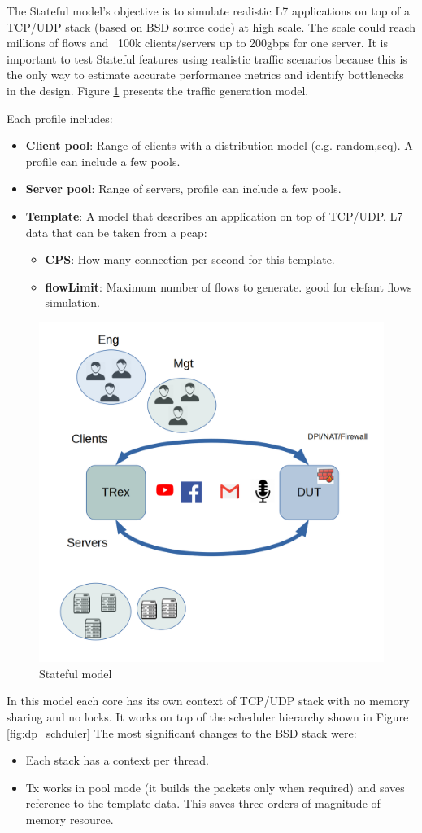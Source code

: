 \documentclass[conference]{IEEEtran}
\begin{document}
The Stateful model's objective is to simulate realistic L7 applications on top of a TCP/UDP stack (based on BSD source code) at high scale.
The scale could reach millions of flows and ~100k clients/servers up to 200gbps for one server. 
It is important to test Stateful features using realistic traffic scenarios because this is the only way to estimate accurate performance metrics and identify bottlenecks in the design. 
Figure \ref{fig:astf} presents the traffic generation model. 

Each profile includes:
\begin{itemize}
  \item \textbf{Client pool}: Range of clients with a distribution model (e.g. random,seq). A profile can include a few pools.
  \item \textbf{Server pool}: Range of servers, profile can include a few pools. 
  \item \textbf{Template}: A model that describes an application on top of TCP/UDP. L7 data that can be taken from a pcap:
  \begin{itemize}
  \item \textbf{CPS}: How many connection per second for this template. 
  \item \textbf{flowLimit}: Maximum number of flows to generate. good for elefant flows simulation.
  \end{itemize}
\end{itemize}

\begin{figure}[h]
  \includegraphics[width=0.3
  \textwidth, center]{stateful_model.png}
  \caption{Stateful model}
  \label{fig:astf}
\end{figure}

In this model each core has its own context of TCP/UDP stack with no memory sharing and no locks. It works on top of the scheduler hierarchy shown in Figure \ref{fig:dp_schduler}
The most significant changes to the BSD stack were:
\begin{itemize}
  \item Each stack has a context per thread.
  \item Tx works in pool mode (it builds the packets only when required) and saves reference to the template data. This saves three orders of magnitude of memory resource.
\end{itemize}
\end{document}
